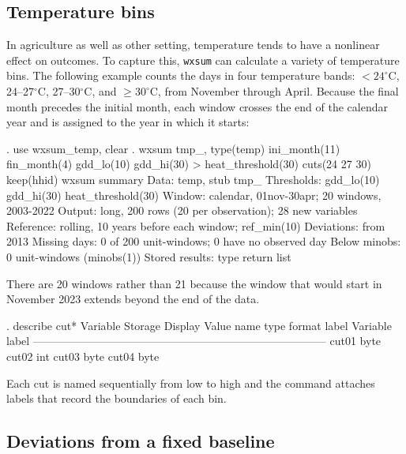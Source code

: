 \subsection{Temperature bins} \label{sec:ex-bins}

In agriculture as well as other setting, temperature tends to have a nonlinear effect on outcomes. To capture this, \texttt{wxsum} can calculate a variety of temperature bins. The following example counts the days in four temperature bands: $< 24^{\circ}$C, 24--27$^{\circ}$C, 27--30$^{\circ}$C, and $\geq 30^{\circ}$C, from November through April. Because the final month precedes the initial month, each window crosses the end of the calendar year and is assigned to the year in which it starts:

\begin{stlog}
. use wxsum_temp, clear
{\smallskip}
. wxsum tmp_, type(temp) ini_month(11) fin_month(4) gdd_lo(10) gdd_hi(30)
> heat_threshold(30) cuts(24 27 30) keep(hhid)
{\smallskip}
wxsum summary
  Data:          temp, stub tmp_
  Thresholds:    gdd_lo(10) gdd_hi(30) heat_threshold(30)
  Window:        calendar, 01nov-30apr; 20 windows, 2003-2022
  Output:        long, 200 rows (20 per observation); 28 new variables
  Reference:     rolling, 10 years before each window; ref_min(10)
  Deviations:    from 2013
  Missing days:  0 of 200 unit-windows; 0 have no observed day
  Below minobs:  0 unit-windows (minobs(1))
  Stored results: type return list
\end{stlog}

\noindent There are 20 windows rather than 21 because the window that would start in November 2023 extends beyond the end of the data.

\begin{stlog}
. describe cut*
{\smallskip}
Variable      Storage   Display    Value
    name         type    format    label      Variable label
--------------------------------------------------------------------------------
cut01           byte    %
cut02           int     %
cut03           byte    %
cut04           byte    %
\end{stlog}

\noindent Each cut is named sequentially from low to high and the command attaches labels that record the boundaries of each bin.

\subsection{Deviations from a fixed baseline} \label{sec:ex-baseline}

